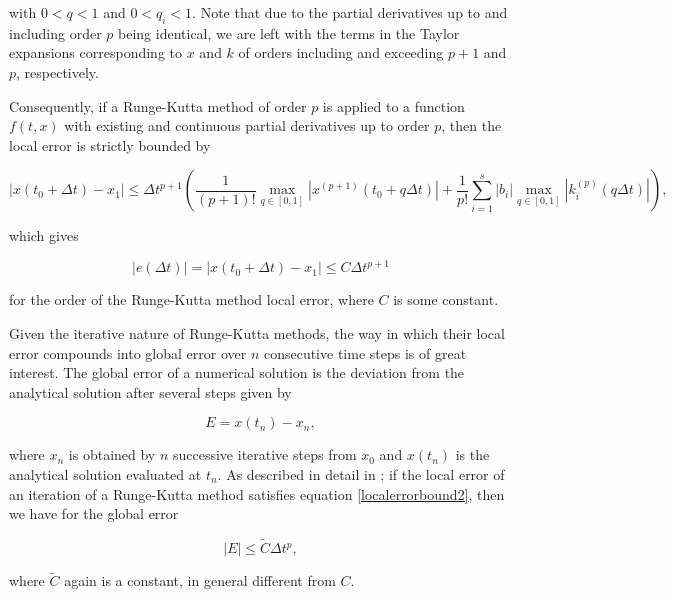 \noindent with $0<q<1$ and $0<q_i<1$. Note that due to the partial derivatives up to and including order $p$ being identical, we are left with the terms in the Taylor expansions corresponding to $x$ and $k$ of orders including and exceeding $p+1$ and $p$, respectively.

Consequently, if a Runge-Kutta method of order $p$ is applied to a function $f(t,x)$ with existing and continuous partial derivatives up to order $p$, then the local error is strictly bounded by

\begin{equation} \label{localerrorbound1}
\left| x(t_0+\Delta t)-x_1 \right| \leq \Delta t^{p+1}\left( \frac{1}{(p+1)!}\max_{q\in [0,1]}\left|x^{(p+1)}(t_0+q\Delta t)\right| + \frac{1}{p!}\sum_{i=1}^{s}\left| b_i\right| \max_{q\in [0,1]}\left|k_i^{(p)}(q\Delta t)\right| \right),
\end{equation}

\noindent which gives

\begin{equation} \label{localerrorbound2}
\left|e(\Delta t)\right| = \left|x(t_0+\Delta t)-x_1\right| \leq C\Delta t^{p+1}
\end{equation}

\noindent for the order of the Runge-Kutta method local error, where $C$ is some constant.

Given the iterative nature of Runge-Kutta methods, the way in which their local error compounds into global error over $n$ consecutive time steps is of great interest. The global error of a numerical solution is the deviation from the analytical solution after several steps given by

\begin{equation}
	E = x(t_n)-x_n,
\end{equation}

\noindent where $x_n$ is obtained by $n$ successive iterative steps from $x_0$ and $x(t_n)$ is the analytical solution evaluated at $t_n$. As described in detail in \cite{SolvingODEs}; if the local error of an iteration of a Runge-Kutta method satisfies equation \eqref{localerrorbound2}, then we have for the global error

\begin{equation} \label{globalerror}
\left| E \right| \leq \tilde{C}\Delta t^p,
\end{equation}

\noindent where $\tilde{C}$ again is a constant, in general different from $C$.


